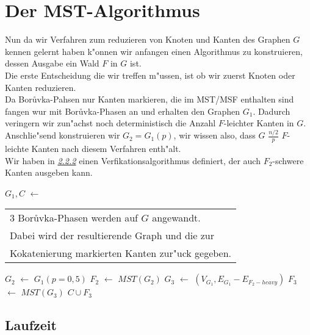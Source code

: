 \section{Der MST-Algorithmus}

Nun da wir Verfahren zum reduzieren von Knoten und Kanten des Graphen $G$ kennen
    gelernt haben  k"onnen wir anfangen einen Algorithmus zu konstruieren,
    dessen Ausgabe ein Wald $F$ in $G$ ist.\\
Die erste Entscheidung die wir treffen m"ussen, ist ob wir zuerst Knoten oder Kanten
    reduzieren. \\
Da Bor\r uvka-Pahsen nur Kanten markieren, die im MST/MSF 
    enthalten sind fangen wur mit Bor\r uvka-Phasen an und erhalten den Graphen 
    $G_1$.
    Dadurch veringern wir
    zun"achst noch deterministisch die Anzahl $F$-leichter Kanten in $G$.
    Anschlie"send konstruieren wir $G_2 = G_1(p)$, wir wissen also, dass $G$ 
    $\frac{n/2}{p}$ $F$-leichte Kanten nach diesem Verfahren enth"alt.\\
Wir haben in \hyperref[sec:verification]{\textit{2.2.2}} einen 
    Verfikationsalgorithmus definiert, der auch $F_2$-schwere Kanten ausgeben
    kann.\\

\begin{algorithm}
\begin{algorithmic}[1]
    \STATE $G_1, C$ $\leftarrow$\begin{tabular}[H]{l}
                                 3 Bor\r uvka-Phasen werden auf $G$ angewandt.\\
                                 Dabei wird der resultierende Graph und die zur\\
                                 Kokatenierung markierten Kanten zur"uck gegeben.
                                 \end{tabular}
    \STATE $G_2$ $\leftarrow$ $G_1(p=0,5)$
    \STATE $F_2$ $\leftarrow$ $MST(G_2)$
    \STATE $G_3$ $\leftarrow$ $(V_{G_1}, E_{G_1} - E_{F_2-heavy})$
    \STATE $F_3$ $\leftarrow$ $MST(G_3)$
    \RETURN $C \cup F_3$
\end{algorithmic}
\end{algorithm}

\subsection{Laufzeit}

